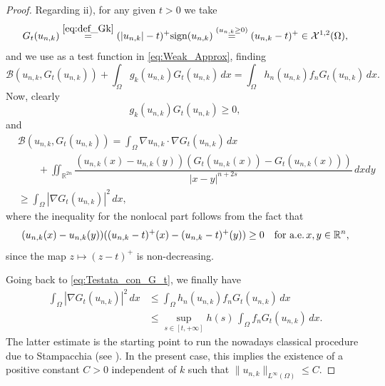 \documentclass[11pt,a4paper]{amsart}
\theoremstyle{definition}
\theoremstyle{plain}
\numberwithin{equation}{section}
\begin{document}
{\begin{proof}
Regarding ii), for any given $t>0$ we take
\begin{equation}
G_{t}(u_{n,k}) \stackrel{\eqref{eq:def_Gk}}{=} (|u_{n,k}|-t)^{+}\textrm{sign}(u_{n,k}) \stackrel{(u_{n,k}\geq 0)}{=} (u_{n,k}-t)^{+} \in \mathcal{X}^{1,2}(\Omega),
\end{equation}  
  \noindent and we use as a test function in \eqref{eq:Weak_Approx}, finding
\begin{equation}\label{eq:Testata_con_G_t}
\mathcal{B}(u_{n,k}, G_{t}(u_{n,k})) + \int_{\Omega}g_{k}(u_{n,k})G_{t}(u_{n,k})\,dx = \int_{\Omega}h_{n}(u_{n,k})f_{n}G_{t}(u_{n,k})\,dx.
\end{equation} 
Now, clearly 
$$g_{k}(u_{n,k})G_{t}(u_{n,k}) \geq 0,$$
\noindent and
\begin{equation}
\begin{aligned}
&\mathcal{B}(u_{n,k}, G_{t}(u_{n,k}))  = \int_{\Omega}\nabla u_{n,k}\cdot \nabla G_{t}(u_{n,k})\, dx \\
&\qquad  + \iint_{\mathbb{R}^{2n}}\dfrac{(u_{n,k}(x)-u_{n,k}(y))(G_{t}(u_{n,k}(x))-G_{t}(u_{n,k}(x)))}{|x-y|^{n+2s}}\, dxdy \\
& \geq \int_{\Omega}|\nabla G_{t}(u_{n,k})|^{2}\, dx,
\end{aligned}
\end{equation}  
\noindent where the inequality for the nonlocal part follows from the fact that
$$(u_{n,k}(x)-u_{n,k}(y))((u_{n,k}-t)^{+}(x)-(u_{n,k}-t)^{+}(y)) \geq 0\quad
\text{for a.e.\,$x,y\in \mathbb{R}^{n}$},$$
 since the map $z\mapsto (z-t)^+$ is non-decreasing.

 Going back to \eqref{eq:Testata_con_G_t}, we finally have
 \begin{equation}
 \begin{aligned}
 \int_{\Omega}|\nabla G_{t}(u_{n,k})|^{2}\, dx &\leq \int_{\Omega}h_{n}(u_{n,k})f_{n}G_{t}(u_{n,k})\, dx\\
 &\leq \sup_{s\in [t,+\infty]}h(s) \, \int_{\Omega}f_{n}G_{t}(u_{n,k})\, dx.
 \end{aligned}
\end{equation}  
  \noindent The latter estimate is the starting point to run the nowadays classical procedure due to Stampacchia (see \cite{Stampacchia}). In the present case, this implies the existence of a positive constant $C>0$ independent of $k$ such that $\|u_{n,k}\|_{L^{\infty}(\Omega)}\leq C$. 
  

\end{proof}}
\end{document}
